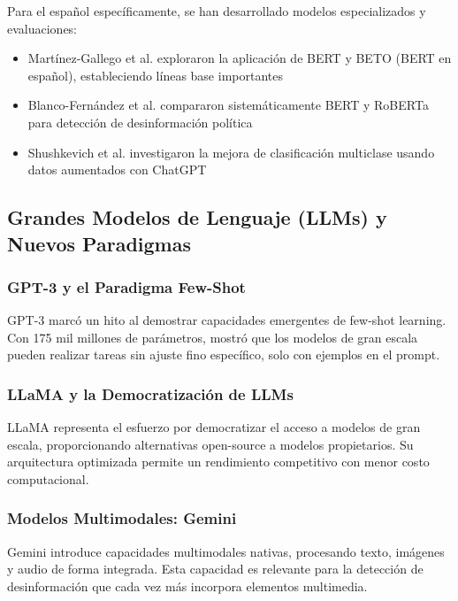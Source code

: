 Para el español específicamente, se han desarrollado modelos especializados y evaluaciones:
\begin{itemize}
    \item Martínez-Gallego et al. \cite{martinez2021fake} exploraron la aplicación de BERT y BETO (BERT en español), estableciendo líneas base importantes
    \item Blanco-Fernández et al. \cite{blanco2024enhancing} compararon sistemáticamente BERT y RoBERTa para detección de desinformación política
    \item Shushkevich et al. \cite{shushkevich2023improving} investigaron la mejora de clasificación multiclase usando datos aumentados con ChatGPT
\end{itemize}

\subsection{Grandes Modelos de Lenguaje (LLMs) y Nuevos Paradigmas}

\subsubsection{GPT-3 y el Paradigma Few-Shot}

GPT-3 \cite{brown2020language} marcó un hito al demostrar capacidades emergentes de few-shot learning. Con 175 mil millones de parámetros, mostró que los modelos de gran escala pueden realizar tareas sin ajuste fino específico, solo con ejemplos en el prompt.

\subsubsection{LLaMA y la Democratización de LLMs}

LLaMA \cite{touvron2023llama} representa el esfuerzo por democratizar el acceso a modelos de gran escala, proporcionando alternativas open-source a modelos propietarios. Su arquitectura optimizada permite un rendimiento competitivo con menor costo computacional.

\subsubsection{Modelos Multimodales: Gemini}

Gemini \cite{gemini2023family} introduce capacidades multimodales nativas, procesando texto, imágenes y audio de forma integrada. Esta capacidad es relevante para la detección de desinformación que cada vez más incorpora elementos multimedia.


